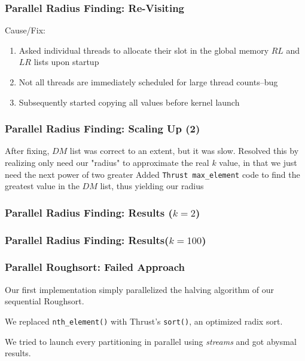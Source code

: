 \documentclass[10pt, xcolor={dvipsnames}, aspectratio=169]{beamer}
\begin{document}
\begin{frame}
	\frametitle{Parallel Radius Finding: Re-Visiting}
	Cause/Fix:
	\begin{enumerate}
		\item Asked individual threads to allocate their slot in the global memory $RL$ and $LR$ lists upon startup
		\item Not all threads are immediately scheduled for large thread counts--bug
		\item Subsequently started copying all values before kernel launch
	\end{enumerate}
	
\end{frame}

\begin{frame}
	\frametitle{Parallel Radius Finding: Scaling Up (2)}
	After fixing, $DM$ list was correct to an extent, but it was slow.
	\newline\newline
	Resolved this by realizing only need our "radius" to approximate the real $k$ value, in that we just need the next power of two greater
	\newline\newline
	Added \texttt{Thrust max_element} code to find the greatest value in the $DM$ list, thus yielding our radius
\end{frame}

\begin{frame}
\frametitle{Parallel Radius Finding: Results ($k = 2$)}
\begin{figure}
\resizebox{!}{.8\textheight}{}
\end{figure}
\end{frame}

\begin{frame}
\frametitle{Parallel Radius Finding: Results($k = 100$)}
\begin{figure}
	\resizebox{!}{.8\textheight}{}
\end{figure}
\end{frame}

\begin{frame}
\frametitle{Parallel Roughsort: Failed Approach}
Our first implementation simply parallelized the halving algorithm of our sequential Roughsort. \newline

We replaced \texttt{nth_element()} with Thrust's \texttt{sort()}, an optimized radix sort. \newline

We tried to launch every partitioning in parallel using \textit{streams} and got abysmal results.
\end{frame}
\end{document}

